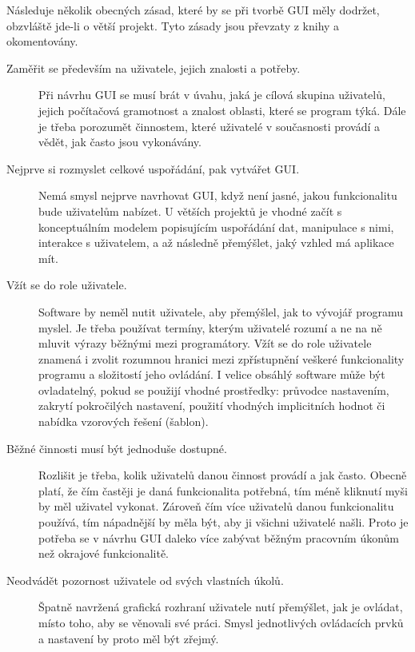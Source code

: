 \documentclass[a4paper,12pt,draft]{article}
\begin{document}
Následuje několik obecných zásad, které by se při tvorbě GUI měly
dodržet, obzvláště jde-li o větší projekt. Tyto zásady jsou převzaty
z knihy \cite{bloopers} a okomentovány.
\begin{description}
    \item[Zaměřit se především na uživatele, jejich znalosti a
    potřeby.] Při návrhu GUI se musí brát v úvahu, jaká je cílová
    skupina uživatelů, jejich počítačová gramotnost a znalost oblasti,
    které se program týká. Dále je třeba porozumět činnostem,
    které uživatelé v současnosti provádí a vědět, jak často jsou
    vykonávány.

\item [Nejprve si rozmyslet celkové uspořádání, pak vytvářet GUI.] Nemá
smysl nejprve navrhovat GUI, když není jasné, jakou funkcionalitu
bude uživatelům nabízet. U větších projektů je vhodné začít s
konceptuálním modelem popisujícím uspořádání dat, manipulace s nimi,
interakce s uživatelem, a až následně přemýšlet, jaký vzhled má
aplikace mít.

\item [Vžít se do role uživatele.] Software by neměl nutit uživatele,
aby přemýšlel, jak to vývojář programu myslel. Je třeba používat
termíny, kterým uživatelé rozumí a ne na ně mluvit výrazy běžnými
mezi programátory. Vžít se do role uživatele znamená i zvolit rozumnou
hranici mezi zpřístupnění veškeré funkcionality programu a složitostí
jeho ovládání. I velice obsáhlý software může být ovladatelný,
pokud se použijí vhodné prostředky: průvodce nastavením, zakrytí
pokročilých nastavení, použití vhodných implicitních hodnot či
nabídka vzorových řešení (šablon).

\item [Běžné činnosti musí být jednoduše dostupné.] Rozlišit je
třeba, kolik uživatelů danou činnost provádí a jak často. Obecně
platí, že čím častěji je daná funkcionalita potřebná, tím méně
kliknutí myši by měl uživatel vykonat. Zároveň čím více uživatelů
danou funkcionalitu používá, tím nápadnější  by měla být, aby
ji všichni uživatelé našli. Proto je potřeba se v návrhu GUI  daleko
více zabývat běžným pracovním úkonům než okrajové funkcionalitě.

\item [Neodvádět pozornost uživatele od svých vlastních úkolů.] Špatně
navržená grafická rozhraní uživatele nutí přemýšlet, jak je ovládat,
místo toho, aby se věnovali své práci. Smysl jednotlivých ovládacích
prvků a nastavení by proto měl být zřejmý.


\end{description}
\end{document}
